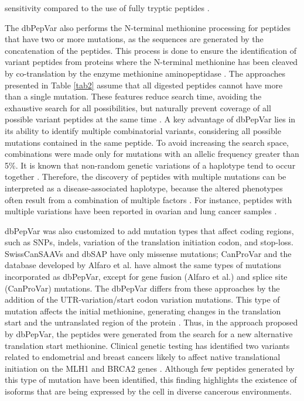 \documentclass{ieeeaccess}
\begin{document}
sensitivity compared to the use of fully tryptic peptides \cite{Chiva2014-jo}. 

 The dbPepVar also performs the N-terminal methionine processing for peptides that have two or more mutations, as the sequences are generated by the concatenation of the peptides. This process is done to ensure the identification of variant peptides from proteins where the N-terminal methionine has been cleaved by co-translation by the enzyme methionine aminopeptidase \cite{Wingfield2017-he}. The approaches presented in Table \ref{tab2} assume that all digested peptides cannot have more than a single mutation. These features reduce search time, avoiding the exhaustive search for all possibilities, but naturally prevent coverage of all possible variant peptides at the same time \cite{Seunghyuk_Choi2020-es}. A key advantage of dbPepVar lies in its ability to identify multiple combinatorial variants, considering all possible mutations contained in the same peptide. To avoid increasing the search space, combinations were made only for mutations with an allelic frequency greater than 5\%. It is known that non-random genetic variations of a haplotype tend to occur together \cite{CHOONG2020}. Therefore, the discovery of peptides with multiple mutations can be interpreted as a disease-associated haplotype, because the altered phenotypes often result from a combination of multiple factors \cite{Na2012-qm}. For instance, peptides with multiple variations have been reported in ovarian and lung cancer samples \cite{Woo2014-tk, CHOONG2020}.
 
dbPepVar was also customized to add mutation types that affect coding regions, such as SNPs, indels, variation of the translation initiation codon, and stop-loss. SwissCanSAAVs and dbSAP have only missense mutations; CanProVar and the database developed by Alfaro et al. have almost the same types of mutations incorporated as dbPepVar, except for gene fusion (Alfaro et al.) and splice site (CanProVar) mutations. The dbPepVar differs from these approaches by the addition of the UTR-variation/start codon variation mutations. This type of mutation affects the initial methionine, generating changes in the translation start and the untranslated region of the protein \cite{Parsons2015-by}. Thus, in the approach proposed by dbPepVar, the peptides were generated from the search for a new alternative translation start methionine. Clinical genetic testing has identified two variants related to endometrial and breast cancers likely to affect native translational initiation on the MLH1 and BRCA2 genes \cite{Parsons2015-by}. Although few peptides generated by this type of mutation have been identified, this finding highlights the existence of isoforms that are being expressed by the cell in diverse cancerous environments.
\end{document}

